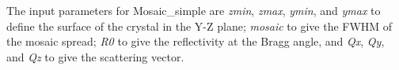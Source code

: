 The input parameters for Mosaic\_simple are \textit{zmin},
\textit{zmax}, \textit{ymin}, and \textit{ymax} to define the surface of
the crystal in the Y-Z plane; \textit{mosaic} to give the FWHM of the
mosaic spread; \textit{R0} to give the reflectivity at the Bragg angle,
and \textit{Qx}, \textit{Qy}, and \textit{Qz} to give the scattering
vector.


